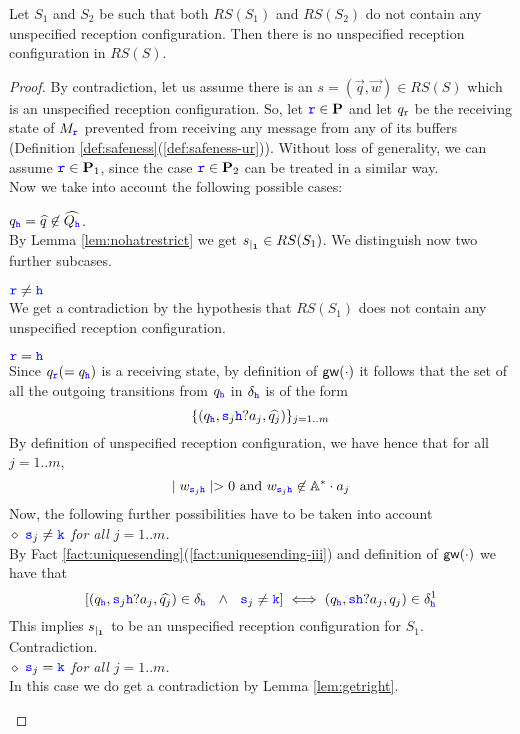 \begin{proposition}
\label{prop:nurPreservation}
Let $S_1$ and $S_2$ be such that both  $RS(S_{1})$ and $RS(S_{2})$ do not contain any unspecified reception configuration.
Then there is no unspecified reception configuration in $RS(S)$.
\end{proposition}

\begin{proof}
By contradiction, let us assume there is an $s= (\vec{q},\vec{w})\in RS(S)$ which is an unspecified reception configuration.
So, let ${\mathtt{\color{blue}{ {r}}}} \in \textbf{P}$ and let ${q}_{\mathtt{\color{blue}{ {r}}}}$  be the receiving state of $M_{\mathtt{\color{blue}{ {r}}}}$ prevented from 
receiving any message from any of its buffers (Definition \ref{def:safeness}(\ref{def:safeness-ur})).
Without loss of generality, we can assume ${\mathtt{\color{blue}{ {r}}}}\in\mathbf{P}_1$, since the case ${\mathtt{\color{blue}{ {r}}}}\in\mathbf{P}_2$ can be
treated in a similar way.\\
Now we  take into account the following possible cases:

\begin{description}
\item 
${q}_{\mathtt{\color{blue}{ {h}}}}=\widehat{q}\not\in \widehat{Q_{\mathtt{\color{blue}{ {h}}}}}$.\\ 
By Lemma \ref{lem:nohatrestrict} we get ${s}_{\mid_{\mathbf{1}}}\in RS(S_1)$. 
We distinguish now two further subcases.
\begin{description}
\item 
${\mathtt{\color{blue}{ {r}}}} \neq { \ensuremath{\mathtt{\color{blue}{ {h}}}} }$\\
We get a contradiction by the hypothesis that $RS(S_{1})$ does not contain any unspecified reception configuration.
\item 
${\mathtt{\color{blue}{ {r}}}} = {\mathtt{\color{blue}{ {h}}}}$\\
Since ${q}_{\mathtt{\color{blue}{ {r}}}}(= {q}_{\mathtt{\color{blue}{ {h}}}})$ is a receiving state,
by definition of $\mathsf{gw}(\cdot)$ it follows that
 the set
of all the outgoing transitions from $q_{\mathtt{\color{blue}{ {h}}}}$ in $\delta_{\mathtt{\color{blue}{ {h}}}}$ is of the form 
$$\{({q}_{\mathtt{\color{blue}{ {h}}}},{\mathtt{\color{blue}{ {s}}}}_j{\mathtt{\color{blue}{ {h}}}}?a_j,\widehat{q_j})\}_{j=1..m}$$
By definition of unspecified reception configuration,  we have hence that for all $j=1..m$, 
$$\mid w_{{\mathtt{\color{blue}{ {s}}}}_j{\mathtt{\color{blue}{ {h}}}}}\mid > 0 
\text{ and } w_{{\mathtt{\color{blue}{ {s}}}}_j{\mathtt{\color{blue}{ {h}}}}}\not\in \mathbb{A}^*\cdot a_j$$
Now, the following further possibilities have to be taken into account\\
\underline{$\diamond$} {\it  ${\mathtt{\color{blue}{ {s}}}}_j\neq{ \ensuremath{\mathtt{\color{blue}{ {k}}}} }$ for all $j=1..m$.}\\
By Fact \ref{fact:uniquesending}(\ref{fact:uniquesending-iii}) and definition of $\mathsf{gw}(\cdot)$ we have that  
$$[(q_{\mathtt{\color{blue}{ {h}}}},{\mathtt{\color{blue}{ {s}}}}_j{\mathtt{\color{blue}{ {h}}}}?a_j,\widehat{q_j})\in\delta_{\mathtt{\color{blue}{ {h}}}}  ~~\wedge ~~
{\mathtt{\color{blue}{ {s}}}}_j\neq{ \ensuremath{\mathtt{\color{blue}{ {k}}}} }] \iff  
(q_{\mathtt{\color{blue}{ {h}}}},{\mathtt{\color{blue}{ {s}}}}{\mathtt{\color{blue}{ {h}}}}?a_j,q_j)\in\delta^1_{\mathtt{\color{blue}{ {h}}}}$$
 This implies ${s}_{\mid_{\mathbf{1}}}$ to be an  unspecified reception configuration for $S_1$. Contradiction.\\
\underline{$\diamond$} {\it ${\mathtt{\color{blue}{ {s}}}}_j = {\mathtt{\color{blue}{ {k}}}}$ for all  $j=1..m$.} \\
In this case we do get a contradiction by Lemma \ref{lem:getright}.
\end{description}



\end{description}
\end{proof}
